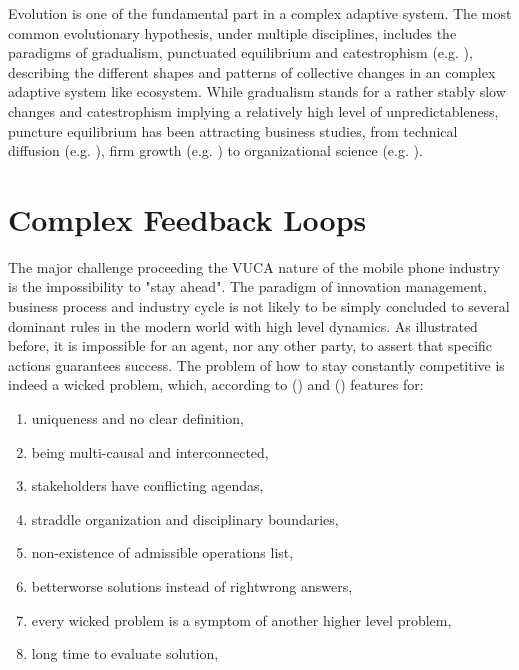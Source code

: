 \documentclass[utf8,english]{gradu3}
\begin{document}
Evolution is one of the fundamental part in a complex adaptive system. The most common evolutionary hypothesis, under multiple disciplines, includes the paradigms of gradualism, punctuated equilibrium and catestrophism (e.g. \cite{gould1972punctuated}), describing the different shapes and patterns of collective changes in an complex adaptive system like ecosystem. While gradualism stands for a rather stably slow changes and catestrophism implying a relatively high level of unpredictableness, puncture equilibrium has been attracting business studies, from technical diffusion (e.g. \cite{loch1999punctuated}),  firm growth (e.g. \cite{mudambi2011proactive}) to organizational science (e.g. \cite{romanelli1994organizational}).

\section{Complex Feedback Loops}

The major challenge proceeding the VUCA nature of the mobile phone industry is the impossibility to "stay ahead". The paradigm of innovation management, business process and industry cycle is not likely to be simply concluded to several dominant rules in the modern world with high level dynamics. As illustrated before, it is impossible for an agent, nor any other party, to assert that specific actions guarantees success. The problem of how to stay constantly competitive is indeed a wicked problem, which, according to \citeauthor{rittel1974wicked} (\citeyear{rittel1974wicked}) and \citeauthor{buchanan1992wicked} (\citeyear{buchanan1992wicked}) features for:

\begin{enumerate}
    \item uniqueness and no clear definition,
    \item being multi-causal and interconnected,
    \item stakeholders have conflicting agendas,
    \item straddle organization and disciplinary boundaries,
    \item non-existence of admissible operations list,
    \item better\/worse solutions instead of right\/wrong answers,
    \item every wicked problem is a symptom of another higher level problem,
    \item long time to evaluate solution,
\end{enumerate}
\end{document}
